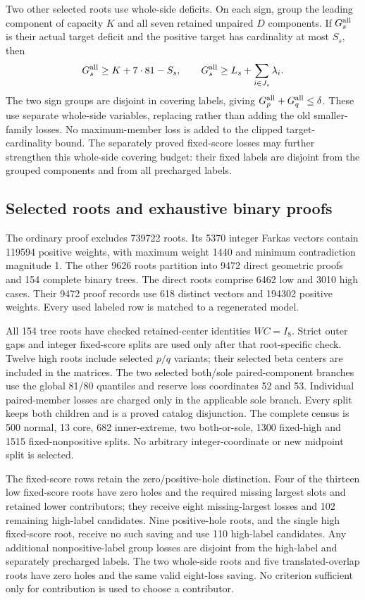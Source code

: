 \documentclass[11pt,a4paper]{article}
\theoremstyle{remark}
\begin{document}
Two other selected roots use whole-side deficits. On each sign, group
the leading component of capacity $K$ and all seven retained unpaired
$D$ components. If $G_s^{\rm all}$ is their actual target deficit and
the positive target has cardinality at most $S_s$, then
\[
 G_s^{\rm all}\ge K+7\cdot81-S_s,
 \qquad G_s^{\rm all}\ge L_s+\sum_{i\in J_s}\lambda_i.
\]
The two sign groups are disjoint in covering labels, giving
$G_p^{\rm all}+G_q^{\rm all}\le\delta$.
These use separate whole-side variables, replacing rather than adding
the old smaller-family losses. No maximum-member loss is added to the
clipped target-cardinality bound. The separately proved fixed-score losses
may further strengthen this whole-side covering budget: their fixed labels
are disjoint from the grouped components and from all precharged labels.

\subsection{Selected roots and exhaustive binary proofs}
The ordinary proof excludes 739722 roots. Its 5370 integer Farkas
vectors contain 119594 positive weights, with maximum weight 1440
and minimum contradiction magnitude 1. The other 9626 roots partition
into 9472 direct geometric proofs and 154 complete binary trees.
The direct roots comprise 6462 low and 3010 high cases.
Their 9472 proof records use 618 distinct vectors and 194302 positive
weights. Every used labeled row is matched to a regenerated model.

All 154 tree roots have checked retained-center identities $WC=I_8$.
Strict outer gaps and integer fixed-score splits are used only after
that root-specific check. Twelve high roots include selected $p/q$
variants; their selected beta centers are included in the matrices.
The two selected both/sole paired-component branches use the global
81/80 quantiles and reserve loss coordinates 52 and 53. Individual
paired-member losses are charged only in the applicable sole branch.
Every split keeps both children and is a proved catalog disjunction.
The complete census is 500 normal, 13 core, 682 inner-extreme,
two both-or-sole, 1300 fixed-high and 1515 fixed-nonpositive splits.
No arbitrary integer-coordinate or new midpoint split is selected.

The fixed-score rows retain the zero/positive-hole distinction.
Four of the thirteen low fixed-score roots have zero holes and the
required missing largest slots and retained lower contributors; they
receive eight missing-largest losses and 102 remaining high-label
candidates. Nine positive-hole roots, and the single high fixed-score
root, receive no such saving and use 110 high-label candidates.
Any additional nonpositive-label group losses are disjoint from the
high-label and separately precharged labels.
The two whole-side roots and five translated-overlap roots have zero
holes and the same valid eight-loss saving. No criterion sufficient
only for contribution is used to choose a contributor.
\end{document}
